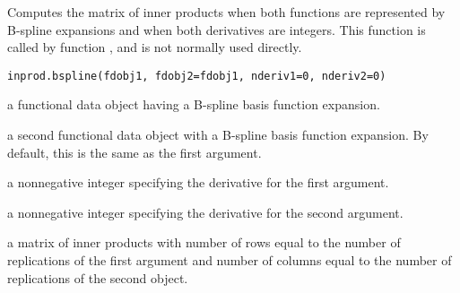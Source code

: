 \begin{Description}\relax
Computes the matrix of inner products when both functions
are represented by B-spline expansions and when both
derivatives are integers.  This function is called by function
, and is not normally used directly.
\end{Description}
\begin{Usage}
\begin{verbatim}
inprod.bspline(fdobj1, fdobj2=fdobj1, nderiv1=0, nderiv2=0)
\end{verbatim}
\end{Usage}
\begin{Arguments}
\begin{ldescription}
\item[\code{fdobj1}] a functional data object having a B-spline basis function
expansion.

\item[\code{fdobj2}] a second functional data object with a B-spline basis
function expansion.  By default, this is the same as
the first argument.

\item[\code{nderiv1}] a nonnegative integer specifying the derivative for the
first argument.

\item[\code{nderiv2}] a nonnegative integer specifying the derivative for the
second argument.

\end{ldescription}
\end{Arguments}
\begin{Value}
a matrix of inner products with number of rows equal
to the number of replications of the first argument and
number of columns equal to the number of replications
of the second object.
\end{Value}

